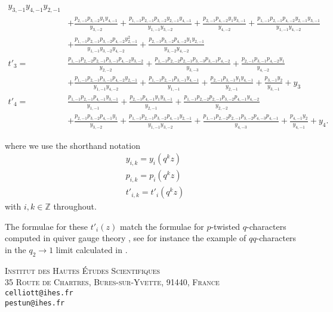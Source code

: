 \documentclass[11pt, oneside, reqno]{amsart}
\theoremstyle{definition} \newtheorem{definition}{Definition}[section]
\theoremstyle{definition} \newtheorem{remark}[definition]{Remark}
\theoremstyle{definition} \newtheorem{remarks}[definition]{Remarks}
\theoremstyle{definition} \newtheorem{question}[definition]{Question}
\theoremstyle{definition} \newtheorem*{note}{Note}
\theoremstyle{definition} \newtheorem{example}[definition]{Example}
\theoremstyle{definition} \newtheorem{examples}[definition]{Examples}
\begin{document}
\begin{align*}
{   y_{3,-1} y_{4,-1}}{y_{2,-1}}\\&+\frac{p_{2,-1} p_{3,-2} y_{1} y_{4,-1}}{y_{3,-2}}+\frac{p_{1,-1} p_{2,-1} p_{3,-2} y_{2,-1} y_{4,-1}}{y_{1,-1} y_{3,-2}}+\frac{p_{2,-1} p_{4,-2} y_{1} y_{3,-1}}{y_{4,-2}}+\frac{p_{1,-1} p_{2,-1}
   p_{4,-2} y_{2,-1} y_{3,-1}}{y_{1,-1} y_{4,-2}}\\&+\frac{p_{1,-1} p_{2,-1} p_{3,-2} p_{4,-2} y_{2,-1}^2}{y_{1,-1} y_{3,-2} y_{4,-2}}+\frac{p_{2,-1} p_{3,-2} p_{4,-2} y_{1} y_{2,-1}}{y_{3,-2} y_{4,-2}} \\
 t'_{3}= &\frac{p_{1,-1} p_{2,-2} p_{2,-1} p_{3,-1} p_{4,-2} y_{3,-2}}{y_{2,-2}}+\frac{p_{1,-1} p_{2,-2} p_{2,-1} p_{3,-3} p_{3,-1} p_{4,-2}}{y_{3,-3}}+\frac{p_{2,-1} p_{3,-1} p_{4,-2} y_{1}}{y_{4,-2}}\\&+\frac{p_{1,-1} p_{2,-1}
   p_{3,-1} p_{4,-2} y_{2,-1}}{y_{1,-1} y_{4,-2}}+\frac{p_{1,-1} p_{2,-1} p_{3,-1} y_{4,-1}}{y_{1,-1}}+\frac{p_{2,-1} p_{3,-1} y_{1} y_{4,-1}}{y_{2,-1}}+\frac{p_{3,-1} y_{2}}{y_{3,-1}}+y_{3} \\
 t'_{4}= &\frac{p_{1,-1} p_{2,-1} p_{4,-1} y_{3,-1}}{y_{1,-1}}+\frac{p_{2,-1} p_{4,-1} y_{1} y_{3,-1}}{y_{2,-1}}+\frac{p_{1,-1} p_{2,-2} p_{2,-1} p_{3,-2} p_{4,-1} y_{4,-2}}{y_{2,-2}}\\&+\frac{p_{2,-1} p_{3,-2} p_{4,-1}
   y_{1}}{y_{3,-2}}+\frac{p_{1,-1} p_{2,-1} p_{3,-2} p_{4,-1} y_{2,-1}}{y_{1,-1} y_{3,-2}}+\frac{p_{1,-1} p_{2,-2} p_{2,-1} p_{3,-2} p_{4,-3} p_{4,-1}}{y_{4,-3}}+\frac{p_{4,-1} y_{2}}{y_{4,-1}}+y_{4}.
\end{align*}

where we use the shorthand notation
\begin{equation*}
\begin{aligned}
y_{i,k} = y_i(q^{k}z) \\ p_{i,k} = p_i(q^{k} z)\\ t'_{i,k} = t'_{i}(q^{k} z)
\end{aligned}
\end{equation*}
 with $i, k \in \mathbb{Z}$ throughout. 

The formulae for these $t'_{i}(z)$ match the formulae for $p$-twisted $q$-characters computed in quiver gauge theory \cite{NekrasovPestunShatashvili}, see for instance the example of $qq$-characters in the $q_2 \to 1$ limit calculated in \cite{Nekrasov:2015wsu}. 
 






\textsc{Institut des Hautes \'Etudes Scientifiques}\\
\textsc{35 Route de Chartres, Bures-sur-Yvette, 91440, France}\\
\texttt{celliott@ihes.fr}\\ 
\texttt{pestun@ihes.fr}
 
\end{document}
